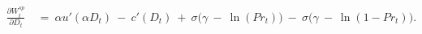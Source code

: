 \begin{equation}
\begin{split}
	\frac{\partial W_{t}^{sp}}{\partial D_{t}} \
	& = \ \alpha u'(\alpha D_{t}) \ - \ c'(D_{t}) \ + \ \sigma \big( \gamma \ - \ \ln(Pr_{t}) \big) \ - \ \sigma \big( \gamma \ - \ \ln( 1 - Pr_{t}) \big).
\end{split}
\label{Equation:Social-Planners-Problem_Marginal-Welfare}
\end{equation}